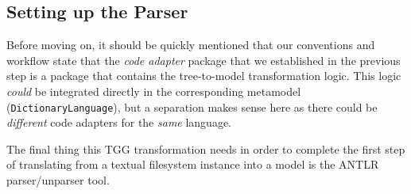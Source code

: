 \newpage
\hypertarget{subSec:setupParser}{}
\subsection{Setting up the Parser}
\genHeader

Before moving on, it should be quickly mentioned that our conventions and workflow state that the \emph{code adapter} package that we established in the
previous step is a package that contains the tree-to-model transformation logic. This logic \emph{could} be integrated directly in the corresponding metamodel
(\texttt{Dic\-tion\-ary\-Language}), but a separation makes sense here as there could be \emph{different} code adapters for the \emph{same} language.

The final thing this TGG transformation needs in order to complete the first step of translating from a textual filesystem instance into a model is the ANTLR
parser/unparser tool.

